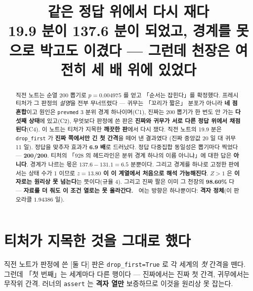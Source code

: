 \documentclass{article}
\title{같은 정답 위에서 다시 재다 \\
  {\large 19.9 분이 137.6 분이 되었고, 경계를 못으로 박고도 이겼다 ---
   그런데 천장은 여전히 세 배 위에 있었다}}
\begin{document}
\maketitle

\begin{abstract}
직전 노트는 순열 200 뽑기로 $p=0.004975$ 를 얻고 「순서는 잡힌다」를 확정했다.
프레시 티처가 그 판정의 \emph{설명}을 전부 무너뜨렸다 --- 귀무는 「꼬리가 짧은」 분포가 아니라
\textbf{네 점 혼합}이고 원인은 \texttt{prevmed} 3 분위 경계 하나이며(C1),
진짜는 200 뽑기가 한 번도 안 가는 \textbf{다섯째 상태}에 있고(C2),
무엇보다 판정에 쓴 판은 \textbf{진짜와 귀무가 서로 다른 정답 위에서 채점된다}(C4).
이 노트는 티처가 지목한 \textbf{깨끗한 판}에서 다시 쟀다.
{직전 노트의 19.9 분은 \texttt{drop\_first} 가 \textbf{진짜 쪽에서만 긴 첫 간격}을 떼어 낸 결과였다
(진짜 중앙값 20 일 대 귀무 11 일). 정답을 맞추자 효과가 \textbf{6.9 배}로 드러났다.
정답 다중집합 동일성은 뽑기마다 찍었다 --- \textbf{200/200}.}
{티처의 「928 의 헤드라인은 분위 경계 하나의 이름 아니냐」에 대한 답은 \textbf{아니다}.
경계가 나르는 몫은 $137.6-131.1=\mathbf{6.5}$ 분뿐이다.
그리고 경계를 하나로 고정한 판에서는 상태 수가 1 이므로
\textbf{$z=13.80$ 이 이 계열에서 처음으로 해석 가능해진다}.}
{$Z>1$ 은 \textbf{이 자로는 원리상 못 넘는다}는 뜻이다(규율 4).
그리고 진짜 팔은 이미 그 천장의 \textbf{98.60\%} 다 ---
\textbf{자료를 더 줘도 이 조건 열로는 못 올라간다.}
🔴 여는 방향은 하나뿐이다: \textbf{격자 정체}(이 판 오라클 $1.94386$ 일).}
\end{abstract}

\section{티처가 지목한 것을 그대로 했다}

직전 노트가 판정에 쓴 [둘 다] 판은 \texttt{drop\_first=True} 로 각 세계의 \emph{첫} 간격을 뗀다.
그런데 「첫 번째」는 세계마다 다른 행이다 --- 진짜에서는 진짜 첫 간격, 귀무에서는 무작위 간격.
러너의 \texttt{assert} 는 \textbf{격자 열만} 보증하므로 이것을 원리상 못 잡는다.
\end{document}
